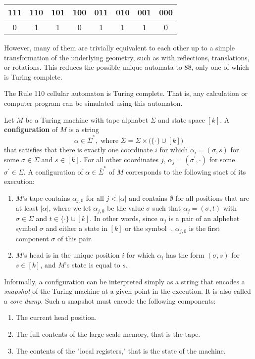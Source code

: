   \begin{center}
  \begin{tabular}{c|c|c|c|c|c|c|c}
      111	&110	&101	&100	&011	&010	&001	&000 \\
      \hline
      0&1&1&0&1&1&1&0
  \end{tabular}
  \end{center}

  However, many of them are trivially equivalent to each other up to a simple transformation of the underlying geometry, such as with reflections, translations, or rotations. This reduces the possible unique automata to 88, only one of which is Turing complete. 

  \begin{theorem}
  The Rule 110 cellular automaton is Turing complete. That is, any calculation or computer program can be simulated using this automaton. 
  \end{theorem}

  \begin{definition}
  Let $M$ be a Turing machine with tape alphabet $\Sigma$ and state space $[k]$. A \textbf{configuration} of $M$ is a string 
  \[\alpha \in \overline{\Sigma}^*, \text{ where } \overline{\Sigma} = \Sigma \times \big( \{ \cdot \} \cup [k] \big)\]
  that satisfies that there is exactly one coordinate $i$ for which $\alpha_i = (\sigma, s)$ for some $\sigma \in \Sigma$ and $s \in [k]$. For all other coordinates $j$, $\alpha_j = (\sigma^\prime, \cdot)$ for some $\sigma^\prime \in \Sigma$. A configuration of $\alpha \in \overline{\Sigma}^*$ of $M$ corresponds to the following staet of its execution: 
  \begin{enumerate}
      \item $M$'s tape contains $\alpha_{j, 0}$ for all $j < |\alpha|$ and contains $\emptyset$ for all positions that are at least $|\alpha|$, where we let $\alpha_{j, 0}$ be the value $\sigma$ such that $\alpha_j = (\sigma, t)$ with $\sigma \in \Sigma$ and $t \in \{\cdot\} \cup [k]$. In other words, since $\alpha_j$ is a pair of an alphebet symbol $\sigma$ and either a state in $[k]$ or the symbol $\cdot$, $\alpha_{j, 0}$ is the first component $\sigma$ of this pair. 
      \item $M$'s head is in the unique position $i$ for which $\alpha_i$ has the form $(\sigma, s)$ for $s \in [k]$, and $M$'s state is equal to $s$. 
  \end{enumerate}
  Informally, a configuration can be interpreted simply as a string that encodes a \textit{snapshot} of the Turing machine at a given point in the execution. It is also called a \textit{core dump}. Such a snapshot must encode the following components: 
  \begin{enumerate}
      \item The current head position. 
      \item The full contents of the large scale memory, that is the tape. 
      \item The contents of the "local registers," that is the state of the machine. 
  \end{enumerate}
  \end{definition}

